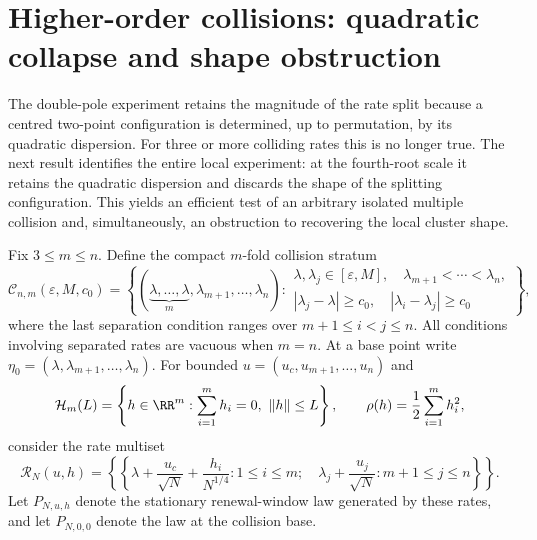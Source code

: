 \section{Higher-order collisions: quadratic collapse and shape obstruction}
\label{sec:multiple-collision-main}

The double-pole experiment retains the magnitude of the rate split because a
centred two-point configuration is determined, up to permutation, by its
quadratic dispersion.  For three or more colliding rates this is no longer
true.  The next result identifies the entire local experiment: at the
fourth-root scale it retains the quadratic dispersion and discards the shape
of the splitting configuration.  This yields an efficient test of an
arbitrary isolated multiple collision and, simultaneously, an obstruction to
recovering the local cluster shape.

Fix \(3\le m\le n\).  Define the compact \(m\)-fold collision stratum
\begin{equation}
 \mathcal C_{n,m}(\varepsilon,M,c_0)=
 \left\{(\underbrace{\lambda,\ldots,\lambda}_{m},
 \lambda_{m+1},\ldots,\lambda_n):
 \begin{array}{l}
 \lambda,\lambda_j\in[\varepsilon,M],\quad
 \lambda_{m+1}<\cdots<\lambda_n,\\
 |\lambda_j-\lambda|\ge c_0,\quad
 |\lambda_i-\lambda_j|\ge c_0
 \end{array}\right\},
\label{eq:main-multiple-collision-stratum}
\end{equation}
where the last separation condition ranges over \(m+1\le i<j\le n\).
All conditions involving separated rates are vacuous when \(m=n\).
At a base point write
\(\eta_0=(\lambda,\lambda_{m+1},\ldots,\lambda_n)\).  For bounded
\(u=(u_c,u_{m+1},\ldots,u_n)\) and
\begin{equation}
 \mathcal H_m(L)=\left\{h\in\RR^m:
 \sum_{i=1}^m h_i=0,\ \|h\|\le L\right\},
 \qquad \rho(h)=\frac12\sum_{i=1}^m h_i^2,
\label{eq:main-cluster-dispersion}
\end{equation}
consider the rate multiset
\begin{equation}
 \mathcal R_N(u,h)=
 \left\{\!\left\{
 \lambda+\frac{u_c}{\sqrt N}+\frac{h_i}{N^{1/4}}:1\le i\le m;
 \quad \lambda_j+\frac{u_j}{\sqrt N}:m+1\le j\le n
 \right\}\!\right\}.
\label{eq:main-multiple-local-rates}
\end{equation}
Let \(P_{N,u,h}\) denote the stationary renewal-window law generated by
these rates, and let \(P_{N,0,0}\) denote the law at the collision base.

